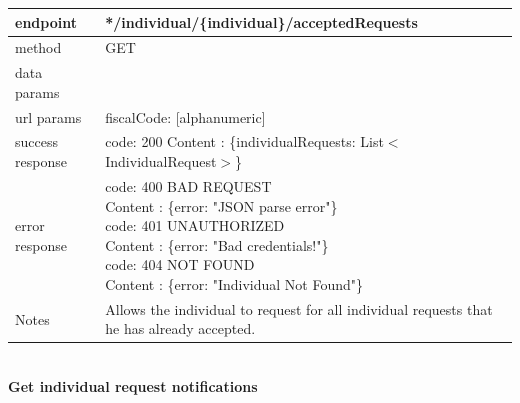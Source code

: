 \begin{legal}
\begin{legal}
\begin{itemize}
								\begin{tabularx}{\linewidth}{| l| l }
									\hline
									endpoint & */individual/\{individual\}/acceptedRequests \\
									\hline
									method & GET \\
									\hline
									data params & \\
									\hline
									url params &
									\parbox{0.7\textwidth}{
										\bigskip
										fiscalCode: [alphanumeric]
										\bigskip
									} \\
									\hline
									success response &
									\parbox{0.7\textwidth}{
										\bigskip
										code: 200\\
										Content : \{individualRequests: List$<$IndividualRequest$>$\}
										\bigskip
									} \\
									\hline
									error response &
									\parbox{0.7\textwidth}{
										\bigskip
										code: 400 BAD REQUEST \\
										Content : \{error: "JSON parse error"\}\\
										code: 401 UNAUTHORIZED \\
										Content : \{error: "Bad credentials!"\}\\
										code: 404 NOT FOUND \\
										Content : \{error: "Individual Not Found"\}
										\bigskip
									} \\
									\hline
									Notes & 
									\parbox{0.7\textwidth}{
										\bigskip Allows the individual to request for all individual requests that he has already accepted.
									\bigskip}  \\
									\hline
								\end{tabularx}\\
								
								\textbf{Get individual request notifications} \\
			

\end{itemize}
\end{legal}
\end{legal}
